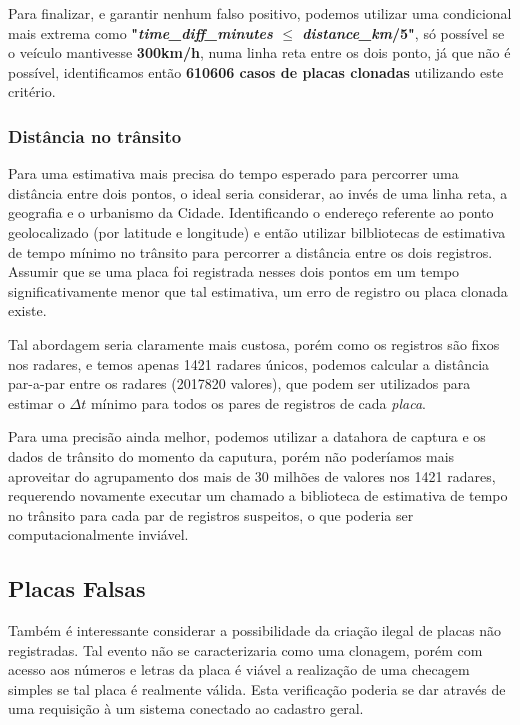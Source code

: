 \documentclass{article}
\begin{document}
Para finalizar, e garantir nenhum falso positivo, podemos utilizar uma condicional mais extrema como \textbf{"\textit{time\_diff\_minutes} $ \leq $ \textit{distance\_km}/5"}, só possível se o veículo mantivesse \textbf{300km/h}, numa linha reta entre os dois ponto, já que não é possível, identificamos então \textbf{610606 casos de placas clonadas} utilizando este critério.

\subsubsection{Distância no trânsito}

Para uma estimativa mais precisa do tempo esperado para percorrer uma distância entre dois pontos, o ideal seria considerar, ao invés de uma linha reta, a geografia e o urbanismo da Cidade. Identificando o endereço referente ao ponto geolocalizado (por latitude e longitude) e então utilizar bilbliotecas de estimativa de tempo mínimo no trânsito para percorrer a distância entre os dois registros. Assumir que se uma placa foi registrada nesses dois pontos em um tempo significativamente menor que tal estimativa, um erro de registro ou placa clonada existe.

Tal abordagem seria claramente mais custosa, porém como os registros são fixos nos radares, e temos apenas 1421 radares únicos, podemos calcular a distância par-a-par entre os radares (2017820 valores), que podem ser utilizados para estimar o $\Delta t$ mínimo para todos os pares de registros de cada \textit{placa}.

Para uma precisão ainda melhor, podemos utilizar a datahora de captura e os dados de trânsito do momento da caputura, porém não poderíamos mais aproveitar do agrupamento dos mais de 30 milhões de valores nos 1421 radares, requerendo novamente executar um chamado a biblioteca de estimativa de tempo no trânsito para cada par de registros suspeitos, o que poderia ser computacionalmente inviável.

\subsection{Placas Falsas}

Também é interessante considerar a possibilidade da criação ilegal de placas não registradas. Tal evento não se caracterizaria como uma clonagem, porém com acesso aos números e letras da placa é viável a realização de uma checagem simples se tal placa é realmente válida. Esta verificação poderia se dar através de uma requisição à um sistema conectado ao cadastro geral.
\end{document}
